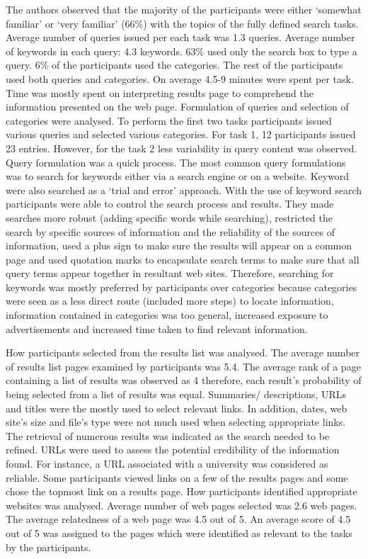 \documentclass[]{article}
\begin{document}
The authors observed that the majority of the participants were either ‘somewhat familiar’ or ‘very familiar’ (66\%) with the topics of the fully defined search tasks. Average number of queries issued per each task was 1.3 queries. Average number of keywords in each query: 4.3 keywords. 63\% used only the search box to type a query. 6\% of the participants used the categories. The rest of the participants used both queries and categories. On average 4.5-9 minutes were spent per task. Time was mostly spent on interpreting results page to comprehend the information presented on the web page. Formulation of queries and selection of categories were analysed. To perform the first two tasks participants issued various queries and selected various categories. For task 1, 12 participants issued 23 entries. However, for the task 2 less variability in query content was observed. Query formulation was a quick process. The most common query formulations was to search for keywords either via a search engine or on a website. Keyword were also searched as a ‘trial and error’ approach. With the use of keyword search participants were able to control the search process and results. They made searches more robust (adding specific words while searching), restricted the search by specific sources of information and the reliability of the sources of information, used a plus sign to make sure the results will appear on a common page and used quotation marks to encapsulate search terms to make sure that all query terms appear together in resultant web sites. Therefore, searching for keywords was mostly preferred by participants over categories because categories were seen as a less direct route (included more steps) to locate information, information contained in categories was too general, increased exposure to advertisements and increased time taken to find relevant information.

How participants selected from the results list was analysed. The average number of results list pages examined by participants was 5.4. The average rank of a page containing a list of results was observed as 4 therefore, each result's probability of being selected from a list of results was equal. Summaries/ descriptions, URLs and titles were the mostly used to select relevant links. In addition, dates, web site's size and file's type were not much used when selecting appropriate links. The retrieval of numerous results was indicated as the search needed to be refined. URLs were used to  assess the potential credibility of the information found. For instance, a URL associated with a university was considered as reliable. Some participants viewed links on a few of the results pages and some chose the topmost link on a results page. How participants identified appropriate websites was analysed. Average number of web pages selected was 2.6 web pages. The average relatedness of a web page was 4.5 out of 5. An average score of 4.5 out of 5 was assigned to the pages which were identified as relevant to the tasks by the participants. 
\end{document}
